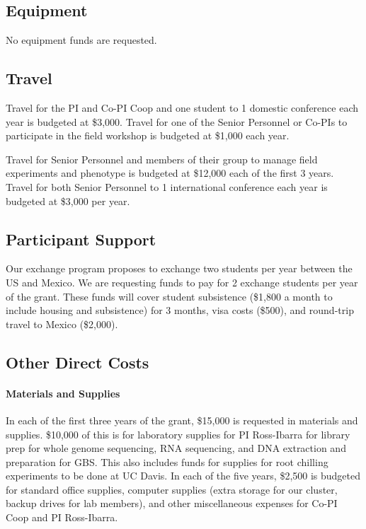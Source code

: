 \subsection*{Equipment}

No equipment funds are requested.

\subsection*{Travel}

Travel for the PI and Co-PI Coop and one student to 1 domestic conference each year is budgeted at \$3,000.  Travel for one of the Senior Personnel or Co-PIs to participate in the field workshop is budgeted at \$1,000 each year.

Travel for Senior Personnel and members of their group to manage field experiments and phenotype is budgeted at \$12,000 each of the first 3 years. Travel for both Senior Personnel to 1 international conference each year is budgeted at \$3,000 per year.

\subsection*{Participant Support}
Our exchange program proposes to exchange two students per year between the US and Mexico.  We are requesting funds to pay for 2 exchange students per year of the grant. These funds will cover student subsistence (\$1,800 a month to include housing and subsistence) for 3 months, visa costs (\$500), and round-trip travel to Mexico (\$2,000).

\subsection*{Other Direct Costs}

 \paragraph{Materials and Supplies}
In each of the first three years of the grant, \$15,000 is requested in materials and supplies.  \$10,000 of this is for laboratory supplies for PI Ross-Ibarra for library prep for whole genome sequencing, RNA sequencing, and DNA extraction and preparation for GBS.  This also includes funds for supplies for root chilling experiments to be done at UC Davis.  In each of the five years, \$2,500 is budgeted for standard office supplies, computer supplies (extra storage for our cluster, backup drives for lab members), and other miscellaneous expenses for Co-PI Coop and PI Ross-Ibarra. 


